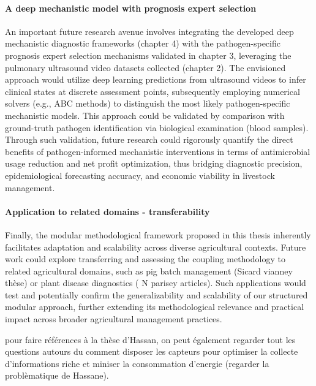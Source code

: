 \paragraph{A deep mechanistic model with prognosis expert selection} An important future research avenue involves integrating the developed deep mechanistic diagnostic frameworks (chapter 4) with the pathogen-specific prognosis expert selection mechanisms validated in chapter 3, leveraging the pulmonary ultrasound video datasets collected (chapter 2). The envisioned approach would utilize deep learning predictions from ultrasound videos to infer clinical states at discrete assessment points, subsequently employing numerical solvers (e.g., ABC methods) to distinguish the most likely pathogen-specific mechanistic models. This approach could be validated by comparison with ground-truth pathogen identification via biological examination (blood samples). Through such validation, future research could rigorously quantify the direct benefits of pathogen-informed mechanistic interventions in terms of antimicrobial usage reduction and net profit optimization, thus bridging diagnostic precision, epidemiological forecasting accuracy, and economic viability in livestock management. 

\paragraph{Application to related domains - transferability} Finally, the modular methodological framework proposed in this thesis inherently facilitates adaptation and scalability across diverse agricultural contexts. Future work could explore transferring and assessing the coupling methodology to related agricultural domains, such as pig batch management (Sicard vianney thèse) or plant disease diagnostics ( N parisey articles). Such applications would test and potentially confirm the generalizability and scalability of our structured modular approach, further extending its methodological relevance and practical impact across broader agricultural management practices.


pour faire références à la thèse d'Hassan, on peut également regarder tout les questions autours du comment disposer les capteurs pour optimiser la collecte d'informations riche et miniser la consommation d'energie (regarder la problèmatique de Hassane). 


